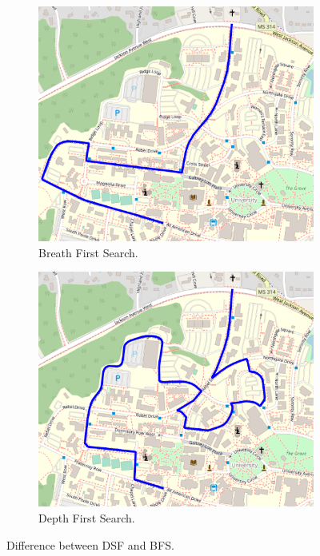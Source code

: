 \documentclass{article}
\begin{document}
\begin{figure}[h!]
    \centering
    \begin{subfigure}[b]{0.4\linewidth}
        \includegraphics[width=\linewidth]{bfsc.png}
        \caption{Breath First Search.}
        \label{fig:bfs}
    \end{subfigure}
    \begin{subfigure}[b]{0.4\linewidth}
        \includegraphics[width=\linewidth]{dfsc.png}
        \caption{Depth First Search.}
        \label{fig:dfs}
    \end{subfigure}
    \caption{Difference between DSF and BFS.}
    \label{fig:difference}
\end{figure}


\printbibliography
\end{document}
